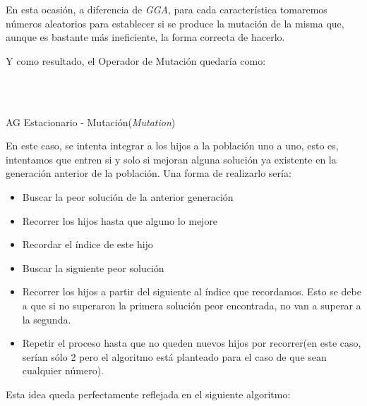 \documentclass[a4paper, 11pt]{article}
\begin{document}
			En esta ocasión, a diferencia de \textit{GGA}, para cada característica tomaremos números
			aleatorios para establecer si se produce la mutación de la misma que, aunque es bastante más
			ineficiente, la forma correcta de hacerlo.
			
			Y como resultado, el Operador de Mutación quedaría como:
			
			\begin{algorithm}[H]
				\begin{algorithmic}[1]
				\REQUIRE \ \\
						 \
						
						\ENDIF
					\ENDFOR
				\ENDFOR
				\end{algorithmic}
			\caption{AG Estacionario - Mutación(\textit{Mutation})}
			\label{SSGA-Mut}
			\end{algorithm}
			
			En este caso, se intenta integrar a los hijos a la población uno a uno, esto es, intentamos
			que entren si y solo si mejoran alguna solución ya existente en la generación anterior de
			la población. Una forma de realizarlo sería:
			
			\begin{itemize}
				\item Buscar la peor solución de la anterior generación
				\item Recorrer los hijos hasta que alguno lo mejore
				\item Recordar el índice de este hijo
				\item Buscar la siguiente peor solución
				\item Recorrer los hijos a partir del siguiente al índice que recordamos. Esto se debe
				a que si no superaron la primera solución peor encontrada, no van a superar a la segunda.
				\item Repetir el proceso hasta que no queden nuevos hijos por recorrer(en este caso,
				serían sólo 2 pero el algoritmo está planteado para el caso de que sean cualquier número).
			\end{itemize}
			
			Esta idea queda perfectamente reflejada en el siguiente algoritmo:
			
\end{document}
